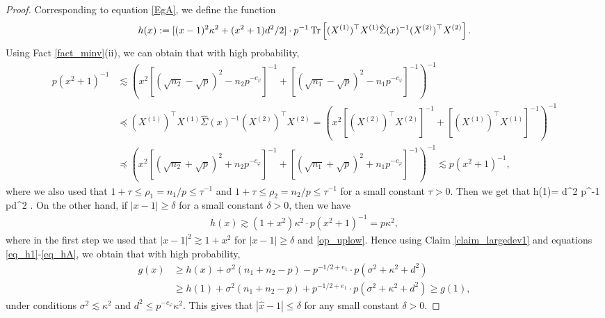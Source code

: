 \begin{proof}
Corresponding to equation \eqref{EgA}, we define the function
\begin{align*}
h(x):= [(x-1)^2\kappa^2 + (x^2+1)d^2/2] \cdot p^{-1} \operatorname{Tr}\left[ (X^{(1)})^\top X^{(1)} \hat\Sigma(x)^{-1}(X^{(2)})^\top X^{(2)}\right].
\end{align*}
Using Fact \ref{fact_minv}(ii), we can obtain that with high probability,
\begin{align}
p(x^2+1)^{-1}&\lesssim \left( x^2 \left[(\sqrt{n_2}-\sqrt{p})^{2}-n_2p^{-c_\varphi}\right]^{-1} +\left[(\sqrt{n_1}-\sqrt{p})^{2}-n_1p^{-c_\varphi}\right]^{-1} \right)^{-1} \nonumber\\
&\preceq (X^{(1)})^\top X^{(1)} \hat\Sigma(x)^{-1}(X^{(2)})^\top X^{(2)} =\left( x^2 [(X^{(2)})^\top X^{(2)}]^{-1} + [(X^{(1)})^\top X^{(1)}]^{-1} \right)^{-1} \nonumber\\
&\preceq \left( x^2 \left[(\sqrt{n_2}+\sqrt{p})^{2}+n_2p^{-c_\varphi}\right]^{-1} +\left[(\sqrt{n_1}+\sqrt{p})^{2}+n_1p^{-c_\varphi}\right]^{-1} \right)^{-1}\lesssim p(x^2+1)^{-1}, \label{op_uplow}
\end{align}
where we also used that $1+\tau\le \rho_1=n_1/p \le \tau^{-1}$ and $1+\tau\le \rho_2=n_2/p \le \tau^{-1}$ for a small constant $\tau>0$. Then we get that
\be\label{eq_h1}h(1)= d^2 \cdot p^{-1} \tr{}\lesssim pd^2 .\ee
On the other hand, if $|x-1|\ge \delta$ for a small constant $\delta>0$, then we have
\begin{align}\label{eq_hA}
h(x)\gtrsim (1+x^2)\kappa^2 \cdot p\left( x^2 +1\right)^{-1} =p\kappa^2 ,
\end{align}
where in the first step we used that $|x-1|^2\gtrsim 1+x^2$ for $|x-1|\ge \delta$ and \eqref{op_uplow}.
Hence using Claim \ref{claim_largedev1} and equations \eqref{eq_h1}-\eqref{eq_hA}, we obtain that with high probability,
\begin{align}
g(x)&\ge  h(x) +\sigma^2(n_1+n_2-p) -p^{-1/2+e_1}\cdot p\left(\sigma^2 +\kappa^2+d^2 \right) \nonumber\\
&\ge h(1) +\sigma^2(n_1+n_2-p) + p^{-1/2+e_1}\cdot p\left(\sigma^2 +\kappa^2+d^2 \right) \ge g(1), \label{gA>g1}
\end{align}
under conditions $\sigma^2 \lesssim  \kappa^2$ and $d^2 \le p^{-c_{\varphi}}{\kappa^2}$. %
This gives that
$|\hat x-1|\le \delta$ for any small constant $\delta>0$.





\end{proof}
